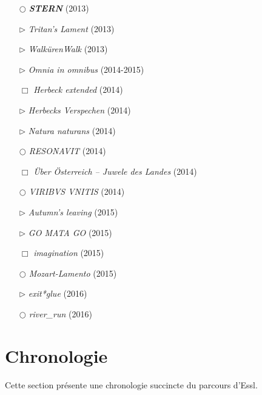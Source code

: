 \documentclass[a4paper,12pt]{article}
\begin{document}
\begin{itemize}
\item[$\bigcirc$] \textbf{\emph{STERN}} (2013)
\item[$\rhd$] \emph{Tritan's Lament} (2013)
\item[$\rhd$] \emph{WalkürenWalk} (2013)
\item[$\rhd$] \emph{Omnia in omnibus} (2014-2015)
\item[$\Box$] \emph{Herbeck extended} (2014)
\item[$\rhd$] \emph{Herbecks Verspechen} (2014)
\item[$\rhd$] \emph{Natura naturans} (2014)
\item[$\bigcirc$] \emph{RESONAVIT} (2014)
\item[$\Box$] \emph{Über Österreich – Juwele des Landes} (2014)
\item[$\bigcirc$] \emph{VIRIBVS VNITIS} (2014)
\item[$\rhd$] \emph{Autumn's leaving} (2015)
\item[$\rhd$] \emph{GO MATA GO} (2015)
\item[$\Box$] \emph{imagination} (2015)
\item[$\bigcirc$] \emph{Mozart-Lamento} (2015)
\item[$\rhd$] \emph{exit*glue} (2016)
\item[$\bigcirc$] \emph{river\_run} (2016)
\end{itemize}

\newpage
\section{Chronologie}

Cette section présente une chronologie succincte du parcours d'Essl.
\end{document}
